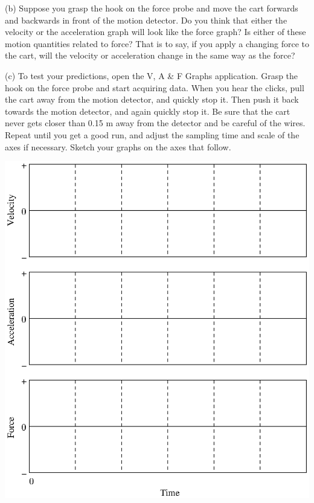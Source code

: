 (b) Suppose you grasp the hook on the force probe and move the cart forwards
and backwards in front of the motion detector. Do you think that either the
velocity or the acceleration graph will look like the force graph? Is either
of these motion quantities related to force? That is to say, if you apply a
changing force to the cart, will the velocity or acceleration change in the
same way as the force?
\vspace{30mm}

(c) To test your predictions, open the V, A \& F Graphs application. Grasp the
hook on the force probe and start acquiring data. When you hear the clicks,
pull the cart away from the motion detector, and quickly stop it. Then push
it back towards the motion detector, and again quickly stop it. Be sure that
the cart never gets closer than 0.15 m away from the detector and be careful
of the wires. Repeat until you get a good run, and adjust the sampling time
and scale of the axes if necessary. Sketch your graphs on the axes that follow.

\vspace{0.3cm}
{\par\centering \includegraphics{force1_fig2.eps} \par}
\vspace{0.3cm}

